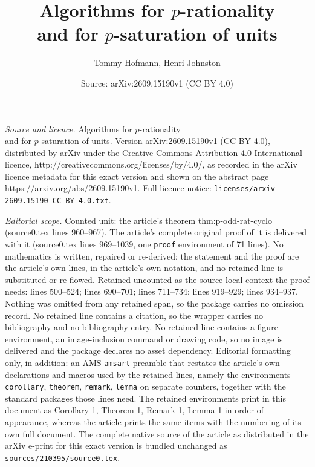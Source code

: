 \documentclass[10pt,a4paper]{amsart}
\title{Algorithms for $p$-rationality\\ and for $p$-saturation of units}
\author{Tommy Hofmann, Henri Johnston}
\date{Source: arXiv:2609.15190v1 (CC BY 4.0)}
\begin{document}
\maketitle

\noindent\emph{Source and licence.} Algorithms for $p$-rationality\\ and for $p$-saturation of units. Version arXiv:2609.15190v1 (CC BY 4.0), distributed by arXiv under the Creative Commons Attribution 4.0 International licence, http://creativecommons.org/licenses/by/4.0/, as recorded in the arXiv licence metadata for this exact version and shown on the abstract page https://arxiv.org/abs/2609.15190v1. Full licence notice: \texttt{licenses/arxiv-2609.15190-CC-BY-4.0.txt}.\par\smallskip

\noindent\textit{Editorial scope.} Counted unit: the article's theorem thm:p-odd-rat-cyclo (source0.tex lines 960--967). The article's complete original proof of it is delivered with it (source0.tex lines 969--1039, one \texttt{proof} environment of 71 lines). No mathematics is written, repaired or re-derived: the statement and the proof are the article's own lines, in the article's own notation, and no retained line is substituted or re-flowed.  Retained uncounted as the source-local context the proof needs: lines 500--524; lines 690--701; lines 711--734; lines 919--929; lines 934--937.  Nothing was omitted from any retained span, so the package carries no omission record.  No retained line contains a citation, so the wrapper carries no bibliography and no bibliography entry.  No retained line contains a figure environment, an image-inclusion command or drawing code, so no image is delivered and the package declares no asset dependency.  Editorial formatting only, in addition: an AMS \texttt{amsart} preamble that restates the article's own declarations and macros used by the retained lines, namely the environments \texttt{corollary}, \texttt{theorem}, \texttt{remark}, \texttt{lemma} on separate counters, together with the standard packages those lines need.  The retained environments print in this document as Corollary 1, Theorem 1, Remark 1, Lemma 1 in order of appearance, whereas the article prints the same items with the numbering of its own full document.  The complete native source of the article as distributed in the arXiv e-print for this exact version is bundled unchanged as \texttt{sources/210395/source0.tex}.
\end{document}
